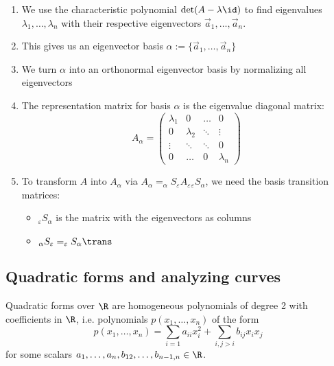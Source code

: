\begin{remark}[Takeaway]
    \begin{enumerate}
        \item We use the characteristic polynomial $\det(A - \lambda\id)$ to find
            eigenvalues $\lambda_1, \dots, \lambda_n$ with their respective eigenvectors $\vec{a}_1, \dots, \vec{a}_n$.
        \item This gives us an eigenvector basis $\alpha := \{\vec{a}_1, \dots, \vec{a}_n\}$
        \item We turn $\alpha$ into an orthonormal eigenvector basis by normalizing all eigenvectors
        \item The representation matrix for basis $\alpha$ is the eigenvalue diagonal matrix:
            $$A_\alpha = \begin{pmatrix}
                \lambda_1 & 0 & \dots & 0 \\
                0 & \lambda_ 2 & \ddots & \vdots \\
                \vdots & \ddots & \ddots & 0 \\
                0 & \dots & 0 & \lambda_n
            \end{pmatrix}$$
        \item To transform $A$ into $A_\alpha$ via $A_\alpha = _\alpha S _\varepsilon A_\varepsilon {_\varepsilon} S _\alpha$, we need
            the basis transition matrices:
            \begin{itemize}
                \item $_\varepsilon S _\alpha$ is the matrix with the eigenvectors as columns
                \item $_\alpha S _\varepsilon = _\varepsilon S _\alpha \trans$
            \end{itemize}
    \end{enumerate}
\end{remark}

\subsection{Quadratic forms and analyzing curves}
\begin{definition}
    Quadratic forms over $\R$ are homogeneous polynomials of degree 2 with 
    coefficients in $\R$, i.e. polynomials $p(x_1,\dots,x_n)$ of the form
    $$p(x_1,\dots,x_n) = \sum_{i=1}a_{ii}x_i^2+\sum_{i,j>i}b_{ij}x_ix_j$$
    for some scalars $a_1,\dots,a_n,b_{12},\dots,b_{n-1,n} \in \R$.
\end{definition}


